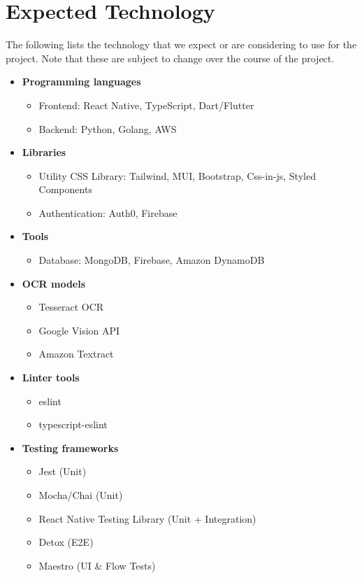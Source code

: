 \documentclass{article}
\begin{document}
\section{Expected Technology}

The following lists the technology that we expect or are considering to use for the project. Note that these are subject to change over the course of the project.

\begin{itemize}
    \item \textbf{Programming languages}
    \begin{itemize}
        \item Frontend: React Native, TypeScript, Dart/Flutter
        \item Backend: Python, Golang, AWS
    \end{itemize}
    
    \item \textbf{Libraries}
    \begin{itemize}
        \item Utility CSS Library: Tailwind, MUI, Bootstrap, Css-in-js, Styled Components
        \item Authentication: Auth0, Firebase
    \end{itemize}
    
    \item \textbf{Tools}
    \begin{itemize}
        \item Database: MongoDB, Firebase, Amazon DynamoDB
    \end{itemize}
    
    \item \textbf{OCR models}
    \begin{itemize}
        \item Tesseract OCR
        \item Google Vision API
        \item Amazon Textract
    \end{itemize}
    
    \item \textbf{Linter tools}
    \begin{itemize}
        \item eslint
        \item typescript-eslint
    \end{itemize}
    
    \item \textbf{Testing frameworks}
    \begin{itemize}
        \item Jest (Unit)
        \item Mocha/Chai (Unit)
        \item React Native Testing Library (Unit + Integration)
        \item Detox (E2E)
        \item Maestro (UI \& Flow Tests)
    \end{itemize}
    

\end{itemize}
\end{document}
